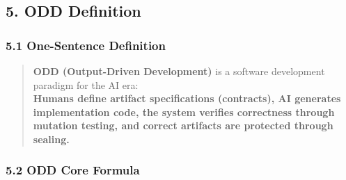 \documentclass[
]{article}
\begin{document}
\hypertarget{5-odd-definition}{%
\subsection{5. ODD Definition}\label{5-odd-definition}}

\hypertarget{51-one-sentence-definition}{%
\subsubsection{5.1 One-Sentence
Definition}\label{51-one-sentence-definition}}

\begin{quote}
\textbf{ODD (Output-Driven Development)} is a software development
paradigm for the AI era:\\
\textbf{Humans define artifact specifications (contracts), AI generates
implementation code, the system verifies correctness through mutation
testing, and correct artifacts are protected through sealing.}
\end{quote}

\hypertarget{52-odd-core-formula}{%
\subsubsection{5.2 ODD Core Formula}\label{52-odd-core-formula}}
\end{document}
